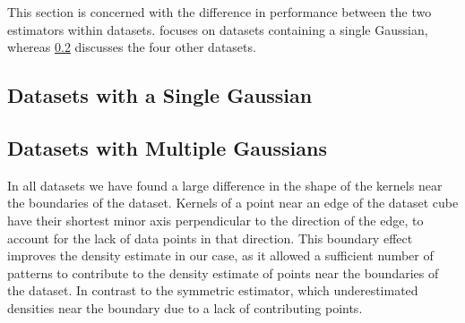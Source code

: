 This section is concerned with the difference in performance between the two estimators within datasets.  focuses on datasets containing a single Gaussian, whereas \cref{s:discussion:multipleGaussians} discusses the four other datasets.

\subsection{Datasets with a Single Gaussian}
	\label{s:discussion:singleGaussian}
	


\subsection{Datasets with Multiple Gaussians}
	\label{s:discussion:multipleGaussians}
	

In all datasets we have found a large difference in the shape of the kernels near the boundaries of the dataset. Kernels of a point near an edge of the dataset cube have their shortest minor axis perpendicular to the direction of the edge, to account for the lack of data points in that direction. This boundary effect improves the density estimate in our case, as it allowed a sufficient number of patterns to contribute to the density estimate of points near the boundaries of the dataset. In contrast to the symmetric estimator, which underestimated densities near the boundary due to a lack of contributing points. 
